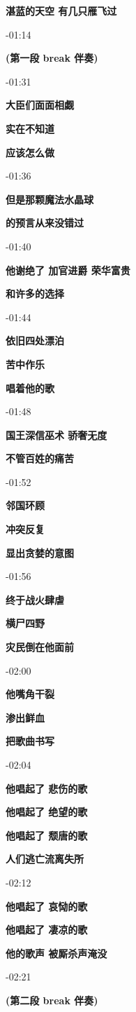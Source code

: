 \documentclass[a4paper]{article}
\begin{document}
\textbf{湛蓝的天空 有几只雁飞过}

-01:14

\textbf{(第一段 break 伴奏)}

-01:31

\textbf{大臣们面面相觑}

\textbf{实在不知道}

\textbf{应该怎么做}

-01:36

\textbf{但是那颗魔法水晶球}

\textbf{的预言从来没错过}

-01:40

\textbf{他谢绝了 加官进爵 荣华富贵}

\textbf{和许多的选择}

-01:44

\textbf{依旧四处漂泊}

\textbf{苦中作乐}

\textbf{唱着他的歌}

-01:48

\textbf{国王深信巫术 骄奢无度}

\textbf{不管百姓的痛苦}

-01:52

\textbf{邻国环顾}

\textbf{冲突反复}

\textbf{显出贪婪的意图}

-01:56

\textbf{终于战火肆虐}

\textbf{横尸四野}

\textbf{灾民倒在他面前}

-02:00

\textbf{他嘴角干裂}

\textbf{渗出鲜血}

\textbf{把歌曲书写}

-02:04

\textbf{他唱起了 悲伤的歌}

\textbf{他唱起了 绝望的歌}

\textbf{他唱起了 颓唐的歌}

\textbf{人们逃亡流离失所}

-02:12

\textbf{他唱起了 哀恸的歌}

\textbf{他唱起了 凄凉的歌}

\textbf{他的歌声 被厮杀声淹没}

-02:21

\textbf{(第二段 break 伴奏)}
\end{document}
